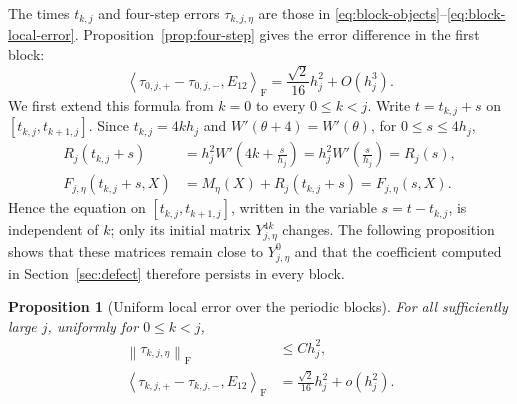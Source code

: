 \documentclass[10pt,a4paper]{amsart}
\numberwithin{equation}{section}
\newtheorem{proposition}[theorem]{Proposition}
\newcommand{\F}{\mathrm F}
\newcommand{\norm}[1]{\left\lVert #1\right\rVert}
\newcommand{\ip}[2]{\left\langle #1,#2\right\rangle_{\F}}
\begin{document}
The times $t_{k,j}$ and four-step errors $\tau_{k,j,\eta}$ are those in
\eqref{eq:block-objects}--\eqref{eq:block-local-error}.
Proposition~\ref{prop:four-step} gives the error difference in the
first block:
\begin{equation}\label{eq:first-block-coefficient-section-five}
 \ip{\tau_{0,j,+}-\tau_{0,j,-}}{E_{12}}
 =\frac{\sqrt2}{16}h_j^2+O(h_j^3).
\end{equation}
We first extend this formula from $k=0$ to every $0\le k<j$.  Write
$t=t_{k,j}+s$ on $[t_{k,j},t_{k+1,j}]$.  Since
$t_{k,j}=4kh_j$ and $W'(\theta+4)=W'(\theta)$, for
$0\le s\le4h_j$,
\begin{equation}\label{eq:block-periodicity}
\begin{aligned}
 R_j(t_{k,j}+s)&=h_j^2W'\left(4k+\frac{s}{h_j}\right)
 =h_j^2W'\left(\frac{s}{h_j}\right)=R_j(s),\\
 F_{j,\eta}(t_{k,j}+s,X)
 &=M_\eta(X)+R_j(t_{k,j}+s)=F_{j,\eta}(s,X).
\end{aligned}
\end{equation}
Hence the equation on $[t_{k,j},t_{k+1,j}]$, written in the variable
$s=t-t_{k,j}$, is independent of $k$; only its initial matrix
$Y_{j,\eta}^{4k}$ changes.  The following proposition shows that these
matrices remain close to $Y^0_{j,\eta}$ and that the
coefficient computed in Section~\ref{sec:defect} therefore persists in
every block.

\begin{proposition}[Uniform local error over the periodic blocks]
\label{prop:uniform-block}
For all sufficiently large $j$, uniformly for $0\le k<j$,
\begin{align}
 \norm{\tau_{k,j,\eta}}_{\F}&\le Ch_j^2,
 \label{eq:block-bound}\\
 \ip{\tau_{k,j,+}-\tau_{k,j,-}}{E_{12}}
 &=\frac{\sqrt2}{16}h_j^2+o(h_j^2).
 \label{eq:block-centered}
\end{align}
\end{proposition}
\end{document}
